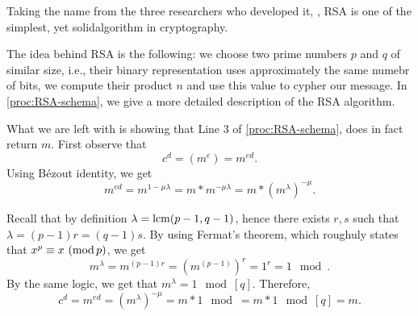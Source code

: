 \documentclass{subfiles}
\begin{document}
    Taking the name from the three researchers who developed it, \citeauthor{RivestSA1977},
        RSA is one of the simplest, yet solid\footnotemark algorithm in cryptography.

    The idea behind RSA is the following: we choose two prime numbers \(p\) and \(q\)
        of similar size, i.e., their binary representation uses approximately the same numebr of bits,
        we compute their product \(n\) and use this value to cypher our message. 
        In \autoref{proc:RSA-schema}, we give a more detailed description of the RSA algorithm.

        


    What we are left with is showing that Line 3 of \autoref{proc:RSA-schema},
        does in fact return \(m\). First observe that 
        \[
            c^{d} = (m^{e}) = m^{ed}.
        \]
        Using Bézout identity, we get 
        \[
            m^{ed} = m^{1 - \mu\lambda} = m * m^{-\mu\lambda} = m * (m^{\lambda})^{-\mu}.
        \]
    
    Recall that by definition \(\lambda = \operatorname{lcm}(p - 1, q - 1)\),
        hence there exists \(r, s\) such that \(\lambda = (p -1)r = (q - 1)s\).
        By using Fermat's theorem, which roughuly states that \(x^{p} \equiv x \mod\),
        we get
        \[
            m^{\lambda} = m^{(p -1)r} = (m^{(p - 1)})^{r} = 1^{r} = 1 \mod.
        \]
        By the same logic, we get that \(m^{\lambda} = 1 \mod[q]\).
        Therefore,
        \[
            c^{d} = m^{ed} = (m^{\lambda})^{-\mu} = m * 1 \mod = m * 1 \mod[q] = m.
        \]
\end{document}
